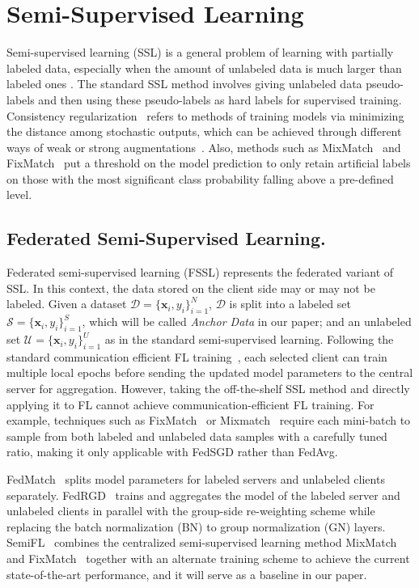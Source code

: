 \documentclass[withindex,glossary,firstyr]{cam-thesis}
\begin{document}
\section{Semi-Supervised Learning} 

Semi-supervised learning (SSL) is a general problem of learning with partially labeled data, especially when the amount of unlabeled data is much larger than labeled ones \citep{zhou2005tri, rasmus2015semi}. The standard SSL method involves giving unlabeled data pseudo-labels \citep{lee2013pseudo} and then using these pseudo-labels as hard labels for supervised training. Consistency regularization~\citep{bachman2014learning} refers to methods of training models via minimizing the distance among stochastic outputs, which can be achieved through different ways of weak or strong augmentations~\citep{cubuk2020randaugment, thulasidasan2019mixup, french2017self}. Also, methods such as MixMatch~\citep{mixmatch} and FixMatch~\citep{fixmatch} put a threshold on the model prediction to only retain artificial labels on those with the most significant class probability falling above a pre-defined level.  

\subsection{Federated Semi-Supervised Learning.} Federated semi-supervised learning (FSSL) represents the federated variant of SSL. In this context, the data stored on the client side may or may not be labeled. Given a dataset $\mathcal{D} = \{ \textbf{x}_i,y_i \}^N_{i=1}$, $\mathcal{D}$ is split into a labeled set $\mathcal{S}= \{ \textbf{x}_i,y_i \}^S_{i=1}$, which will be called \textit{Anchor Data} in our paper; and an unlabeled set $\mathcal{U}= \{ \textbf{x}_i,y_i \}^U_{i=1}$ as in the standard semi-supervised learning. Following the standard communication efficient FL training~\citep{fedavg}, each selected client can train multiple local epochs before sending the updated model parameters to the central server for aggregation. However, taking the off-the-shelf SSL method and directly applying it to FL cannot achieve communication-efficient FL training. For example, techniques such as FixMatch~\citep{fixmatch} or Mixmatch~\citep{mixmatch} require each mini-batch to sample from both labeled and unlabeled data samples with a carefully tuned ratio, making it only applicable with FedSGD rather than FedAvg. 

FedMatch~\citep{fedmatch} splits model parameters for labeled servers and unlabeled clients separately. FedRGD~\citep{zhang2021improving} trains and aggregates the model of the labeled server and unlabeled clients in parallel with the group-side re-weighting scheme while replacing the batch normalization (BN) to group normalization (GN) layers. SemiFL~\citep{semifl} combines the centralized semi-supervised learning method MixMatch~\citep{mixmatch} and FixMatch~\citep{fixmatch} together with an alternate training scheme to achieve the current state-of-the-art performance, and it will serve as a baseline in our paper.
\end{document}
